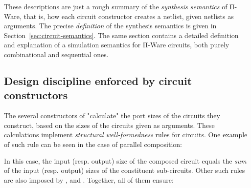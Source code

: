         These descriptions are just a rough summary of the \emph{synthesis semantics} of Π-Ware, that is,
        how each circuit constructor creates a netlist, given netlists as arguments.
        The precise \emph{definition} of the synthesis semantics is given in Section~\ref{sec:circuit-semantics}.
        The same section contains a detailed definition and explanation of a simulation semantics
        for Π-Ware circuits, both purely combinational and sequential ones.

        \subsection{Design discipline enforced by circuit constructors}
            The several constructors of  "calculate" the port sizes of the circuits they construct,
            based on the sizes of the circuits given as arguments.
            These calculations implement \emph{structural well-formedness} rules for circuits.
            One example of such rule can be seen in the case of parallel composition:

            \begin{center}
                \begin{code}
                    \>[4] \<[11]%
                    \>[11]\AgdaSymbol{:}  \AgdaSymbol{\{}   \AgdaSymbol{\}} \<[30]%
                    \>[30]          \AgdaSymbol{(} \AgdaPrimitive{+} \AgdaSymbol{)} \AgdaSymbol{(} \AgdaPrimitive{+} \AgdaSymbol{)}\<%
                \end{code}
            \end{center}

            In this case, the input (resp. output) size of the composed circuit equals the \emph{sum}
            of the input (resp. output) sizes of the constituent sub-circuits.
            Other such rules are also imposed by ,  and .
            Together, all of them ensure:

